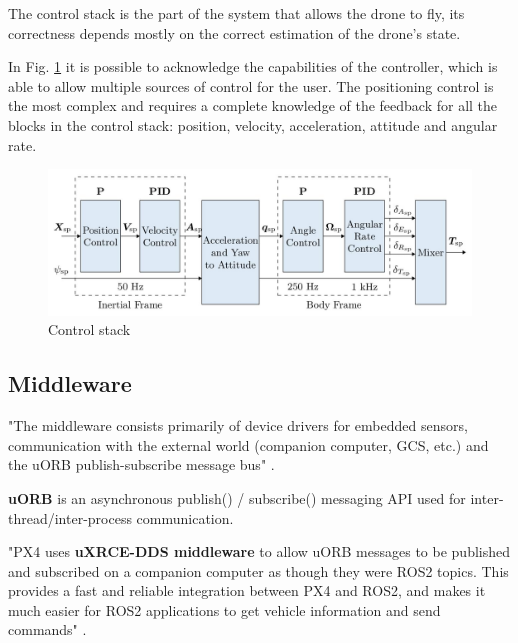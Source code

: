 \documentclass[journal]{IEEEtran}
\begin{document}
The control stack is the part of the system that allows the drone to fly, its correctness depends mostly on the correct estimation of the drone’s state.

In Fig. \ref{fig:mc_control_arch} it is possible to acknowledge the capabilities of the controller, which is able to allow multiple sources of control for the user. The positioning control is the most complex and requires a complete knowledge of the feedback for all the blocks in the control stack: position, velocity, acceleration, attitude and angular rate.


\begin{figure}
    \centering
    \includegraphics[scale=0.19]{Images/mc_control_arch.jpg}
    \caption{Control stack}
    \label{fig:mc_control_arch}
\end{figure}

\subsection{Middleware}

"The middleware consists primarily of device drivers for embedded sensors, communication with the external world (companion computer, GCS, etc.) and the uORB publish-subscribe message bus" \cite{px4_architecture_flight_stack}.

\textbf{uORB} is an asynchronous publish() / subscribe() messaging API used for inter-thread/inter-process communication. 

"PX4 uses \textbf{uXRCE-DDS middleware} to allow uORB messages to be published and subscribed on a companion computer as though they were ROS2 topics. This provides a fast and reliable integration between PX4 and ROS2, and makes it much easier for ROS2 applications to get vehicle information and send commands" \cite{px4_middleware}.
\end{document}
